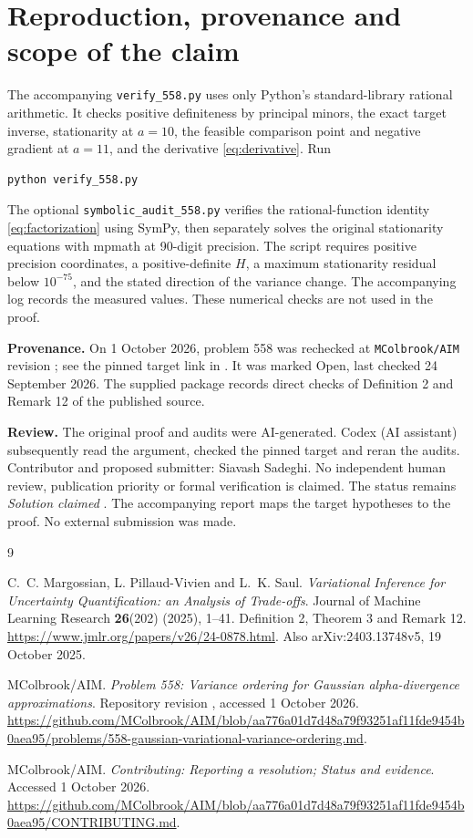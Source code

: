\documentclass[11pt]{article}
\theoremstyle{remark}\newtheorem{remark}[theorem]{Remark}
\begin{document}
\section{Reproduction, provenance and scope of the claim}
The accompanying \texttt{verify\_558.py} uses only Python's standard-library rational arithmetic. It checks positive definiteness by principal minors, the exact target inverse, stationarity at $a=10$, the feasible comparison point and negative gradient at $a=11$, and the derivative \eqref{eq:derivative}. Run
\begin{verbatim}
python verify_558.py
\end{verbatim}
The optional \texttt{symbolic\_audit\_558.py} verifies the rational-function identity \eqref{eq:factorization} using SymPy, then separately solves the original stationarity equations with mpmath at 90-digit precision. The script requires positive precision coordinates, a positive-definite $H$, a maximum stationarity residual below $10^{-75}$, and the stated direction of the variance change. The accompanying log records the measured values. These numerical checks are not used in the proof.

\textbf{Provenance.} On 1 October 2026, problem 558 was rechecked at \texttt{MColbrook/AIM} revision ; see the pinned target link in \cite{aim}. It was marked Open, last checked 24 September 2026. The supplied package records direct checks of Definition 2 and Remark 12 of the published source.

\textbf{Review.} The original proof and audits were AI-generated. Codex (AI assistant) subsequently read the argument, checked the pinned target and reran the audits. Contributor and proposed submitter: Siavash Sadeghi. No independent human review, publication priority or formal verification is claimed. The status remains \emph{Solution claimed} \cite{contributing}. The accompanying report maps the target hypotheses to the proof. No external submission was made.

\begin{thebibliography}{9}
\raggedright\small
{}
C.~C. Margossian, L. Pillaud-Vivien and L.~K. Saul.
\emph{Variational Inference for Uncertainty Quantification: an Analysis of Trade-offs}.
Journal of Machine Learning Research \textbf{26}(202) (2025), 1--41.
Definition 2, Theorem 3 and Remark 12.
\url{https://www.jmlr.org/papers/v26/24-0878.html}.
Also arXiv:2403.13748v5, 19 October 2025.

MColbrook/AIM.
\emph{Problem 558: Variance ordering for Gaussian alpha-divergence approximations}.
Repository revision , accessed 1 October 2026.
\url{https://github.com/MColbrook/AIM/blob/aa776a01d7d48a79f93251af11fde9454b0aea95/problems/558-gaussian-variational-variance-ordering.md}.

MColbrook/AIM. \emph{Contributing: Reporting a resolution; Status and evidence}.
Accessed 1 October 2026.
\url{https://github.com/MColbrook/AIM/blob/aa776a01d7d48a79f93251af11fde9454b0aea95/CONTRIBUTING.md}.
\end{thebibliography}
\end{document}
